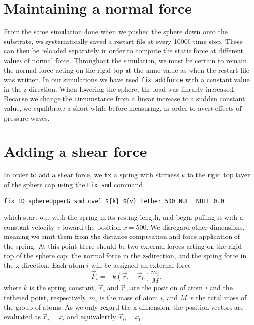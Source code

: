 \documentclass[twoside,english]{uiofysmaster}
\begin{document}
\section{Maintaining a normal force}
From the same simulation done when we pushed the sphere down onto the substrate, we systematically saved a restart file at every 10000 time step.
These can then be reloaded separately in order to compute the static force at different values of normal force.
Throughout the simulation, we must be certain to remain the normal force acting on the rigid top at the same value as when the restart file was written.
In our simulations we have used \texttt{fix addforce} with a constant value in the z-direction.
When lowering the sphere, the load was linearly increased. 
Because we change the circumstance from a linear increase to a sudden constant value, we equilibrate a short while before measuring, in order to avert effects of pressure waves.

\section{Adding a shear force}
In order to add a shear force, we fix a spring with stiffness $k$ to the rigid top layer of the sphere cap using the \texttt{Fix smd} command
 \begin{lstlisting}[language=LammpsInput, caption={LAMMPS command \texttt{Fix smd}, used to add a spring force to a group of atoms. The spring is considered fixed to the center of mass of the group and to a teatherd point, which we may move either with contant velocity of constant force.} ]
 fix ID sphereUpperG smd cvel ${k} ${v} tether 500 NULL NULL 0.0
 \end{lstlisting}
 which start out with the spring in its resting length, and begin pulling it with a constant velocity $v$ toward the position $x=500$. 
We disregard other dimensions, meaning we omit them from the distance computation and force application of the spring.
At this point there should be two external forces acting on the rigid top of the sphere cap: the normal force in the z-direction, and the spring force in the x-direction.
Each atom $i$ will be assigned an external force 
\begin{equation}
	\vec{F}_i = -k(\vec{r}_i- \vec{r}_0)\frac{m_i}{M},
\end{equation}
where $k$ is the spring constant, $\vec{r}_i$ and $\vec{r}_0$ are the position of atom $i$ and the tethered point, respectively, $m_i$ is the mass of atom $i$, and $M$ is the total mass of the group of atoms. 
As we only regard the x-dimension, the position vectors are evaluated as $\vec{r}_i=x_i$ and equivalently $\vec{r}_0 = x_0$.
\end{document}
